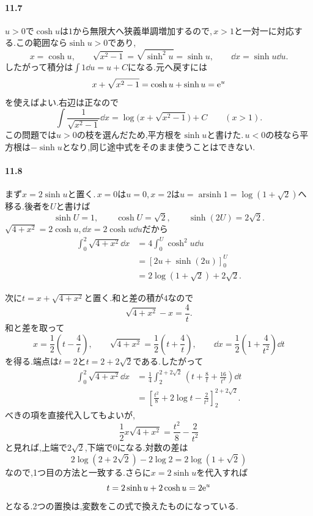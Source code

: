 \paragraph{11.7}
$u>0$で$\cosh u$は$1$から無限大へ狭義単調増加するので,\,$x>1$と一対一に対応する.この範囲なら$\sinh u>0$であり,
\[
x=\cosh u,\qquad
\sqrt{x^2-1}=\sqrt{\sinh^2u}=\sinh u,\qquad
\dd x=\sinh u\dd u.
\]
したがって積分は$\int1\dd u=u+C$になる.元へ戻すには
\[
x+\sqrt{x^2-1}=\cosh u+\sinh u=\mathrm{e}^u
\]
を使えばよい.右辺は正なので
\[
\int\frac1{\sqrt{x^2-1}}\dd x
=\log\bigl(x+\sqrt{x^2-1}\bigr)+C\qquad(x>1).
\]
この問題では$u>0$の枝を選んだため,平方根を$\sinh u$と書けた.\,$u<0$の枝なら平方根は$-\sinh u$となり,同じ途中式をそのまま使うことはできない.

\paragraph{11.8}
まず$x=2\sinh u$と置く.\,$x=0$は$u=0$,\,$x=2$は$u=\operatorname{arsinh}1=\log(1+\sqrt2)$へ移る.後者を$U$と書けば
\[
\sinh U=1,\qquad\cosh U=\sqrt2,\qquad\sinh(2U)=2\sqrt2.
\]
$\sqrt{4+x^2}=2\cosh u$,\,$\dd x=2\cosh u\dd u$だから
\[
\begin{aligned}
\int_0^2\sqrt{4+x^2}\dd x
&=4\int_0^U\cosh^2u\dd u\\
&=\left[2u+\sinh(2u)\right]_0^U\\
&=2\log(1+\sqrt2)+2\sqrt2.
\end{aligned}
\]

次に$t=x+\sqrt{4+x^2}$と置く.和と差の積が$4$なので
\[
\sqrt{4+x^2}-x=\frac4t.
\]
和と差を取って
\[
x=\frac12\left(t-\frac4t\right),\qquad
\sqrt{4+x^2}=\frac12\left(t+\frac4t\right),\qquad
\dd x=\frac12\left(1+\frac4{t^2}\right)\dd t
\]
を得る.端点は$t=2$と$t=2+2\sqrt2$である.したがって
\[
\begin{aligned}
\int_0^2\sqrt{4+x^2}\dd x
&=\frac14\int_2^{2+2\sqrt2}
 \left(t+\frac8t+\frac{16}{t^3}\right)\dd t\\
&=\left[\frac{t^2}{8}+2\log t-\frac2{t^2}\right]_2^{2+2\sqrt2}.
\end{aligned}
\]
べきの項を直接代入してもよいが,
\[
\frac12x\sqrt{4+x^2}=\frac{t^2}{8}-\frac2{t^2}
\]
と見れば,上端で$2\sqrt2$,下端で$0$になる.対数の差は
\[
2\log(2+2\sqrt2)-2\log2=2\log(1+\sqrt2)
\]
なので,1つ目の方法と一致する.さらに$x=2\sinh u$を代入すれば
\[
t=2\sinh u+2\cosh u=2\mathrm{e}^u
\]
となる.2つの置換は,変数をこの式で換えたものになっている.
